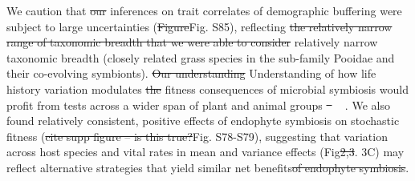 \documentclass[lineno, sn-basic]{sn-jnl}%
\providecommand{\DIFadd}[1]{{\protect\color{blue}#1}} %
\providecommand{\DIFdel}[1]{{\protect\color{red}\protect\scriptsize\sout{#1}}}
\providecommand{\DIFadd}[1]{{\protect\color{blue}\uwave{#1}}} %
\providecommand{\DIFdel}[1]{{\protect\color{red}\sout{#1}}}                      %
\providecommand{\DIFaddbegin}{} %
\providecommand{\DIFaddend}{} %
\providecommand{\DIFdelbegin}{} %
\providecommand{\DIFdelend}{} %
\newcommand{\DIFscaledelfig}{0.5}
\newlength{\DIFdelgraphicswidth} %
\newlength{\DIFdelgraphicsheight} %
\newcommand{\DIFaddincludegraphics}[2][]{{\color{blue}\fbox{\DIFOincludegraphics[#1]{#2}}}} %
\newcommand{\DIFdelincludegraphics}[2][]{%
\sbox{\DIFdelgraphicsbox}{\DIFOincludegraphics[#1]{#2}}%
\settoboxwidth{\DIFdelgraphicswidth}{\DIFdelgraphicsbox} %
\settoboxtotalheight{\DIFdelgraphicsheight}{\DIFdelgraphicsbox} %
\scalebox{\DIFscaledelfig}{%
\parbox[b]{\DIFdelgraphicswidth}{\usebox{\DIFdelgraphicsbox}\\[-\baselineskip] \rule{\DIFdelgraphicswidth}{0em}}\llap{\resizebox{\DIFdelgraphicswidth}{\DIFdelgraphicsheight}{%
\setlength{\unitlength}{\DIFdelgraphicswidth}%
\begin{picture}(1,1)%
\thicklines\linethickness{2pt} %
{\color[rgb]{1,0,0}\put(0,0){\framebox(1,1){}}}%
{\color[rgb]{1,0,0}\put(0,0){\line( 1,1){1}}}%
{\color[rgb]{1,0,0}\put(0,1){\line(1,-1){1}}}%
\end{picture}%
}\hspace*{3pt}}} %
} %
\DeclareRobustCommand{\DIFaddbegin}{\DIFOaddbegin \let\includegraphics\DIFaddincludegraphics} %
\DeclareRobustCommand{\DIFaddend}{\DIFOaddend \let\includegraphics\DIFOincludegraphics} %
\DeclareRobustCommand{\DIFdelbegin}{\DIFOdelbegin \let\includegraphics\DIFdelincludegraphics} %
\DeclareRobustCommand{\DIFdelend}{\DIFOaddend \let\includegraphics\DIFOincludegraphics} %
\begin{document}
We caution that \DIFdelbegin \DIFdel{our }\DIFdelend inferences on trait correlates of demographic buffering were subject to large uncertainties (\DIFdelbegin \DIFdel{Figure}\DIFdelend \DIFaddbegin \DIFadd{Fig. S85}\DIFaddend ), reflecting \DIFdelbegin \DIFdel{the relatively narrow range of taxonomic breadth that we were able to consider }\DIFdelend \DIFaddbegin \DIFadd{relatively narrow taxonomic breadth }\DIFaddend (closely related grass species in the sub-family Pooidae and their co-evolving symbionts).
\DIFdelbegin \DIFdel{Our understanding }\DIFdelend \DIFaddbegin \DIFadd{Understanding }\DIFaddend of how life history variation modulates \DIFdelbegin \DIFdel{the }\DIFdelend fitness consequences of microbial symbiosis would profit from tests across a wider span of plant and animal groups \DIFdelbegin \DIFdel{\mbox{%
\cite{jeschke2009roles}}\hspace{0pt}%
}\DIFdelend \DIFaddbegin \DIFadd{\mbox{%
\citep{jeschke2009roles}}\hspace{0pt}%
}\DIFaddend . 
We also found relatively consistent, positive effects of endophyte symbiosis on stochastic fitness (\DIFdelbegin \DIFdel{cite supp figure -- is this true?}\DIFdelend \DIFaddbegin \DIFadd{Fig. S78-S79}\DIFaddend ), suggesting that variation across host species and vital rates in mean and variance effects (Fig\DIFdelbegin \DIFdel{2,3}\DIFdelend \DIFaddbegin \DIFadd{. 3C}\DIFaddend ) may reflect alternative strategies that yield similar net benefits\DIFdelbegin \DIFdel{of endophyte symbiosis}\DIFdelend . 
\end{document}
